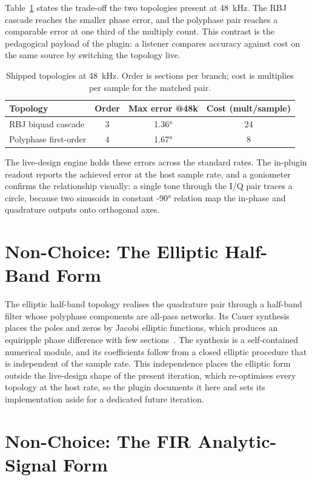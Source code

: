 \documentclass[11pt,a4paper]{article}
\begin{document}
Table~\ref{tab:compare} states the trade-off the two topologies present at \SI{48}{\kilo\hertz}.
The RBJ cascade reaches the smaller phase error, and the polyphase pair reaches a comparable error at one third of the multiply count.
This contrast is the pedagogical payload of the plugin: a listener compares accuracy against cost on the same source by switching the topology live.

\begin{table}[h]
\centering
\caption{Shipped topologies at \SI{48}{\kilo\hertz}. Order is sections per branch; cost is multiplies per sample for the matched pair.}
\label{tab:compare}
\begin{tabular}{@{}lccc@{}}
\toprule
Topology & Order & Max error @48k & Cost (mult/sample) \\
\midrule
RBJ biquad cascade        & 3 & \ang{1.36} & 24 \\
Polyphase first-order     & 4 & \ang{1.67} & 8  \\
\bottomrule
\end{tabular}
\end{table}

The live-design engine holds these errors across the standard rates.
The in-plugin readout reports the achieved error at the host sample rate, and a goniometer confirms the relationship visually: a single tone through the I/Q pair traces a circle, because two sinusoids in constant \ang{-90} relation map the in-phase and quadrature outputs onto orthogonal axes.

\section{Non-Choice: The Elliptic Half-Band Form}

The elliptic half-band topology realises the quadrature pair through a half-band filter whose polyphase components are all-pass networks.
Its Cauer synthesis places the poles and zeros by Jacobi elliptic functions, which produces an equiripple phase difference with few sections~\cite{SchusslerSteffen1998}.
The synthesis is a self-contained numerical module, and its coefficients follow from a closed elliptic procedure that is independent of the sample rate.
This independence places the elliptic form outside the live-design shape of the present iteration, which re-optimises every topology at the host rate, so the plugin documents it here and sets its implementation aside for a dedicated future iteration.

\section{Non-Choice: The FIR Analytic-Signal Form}
\label{sec:fir}
\end{document}
